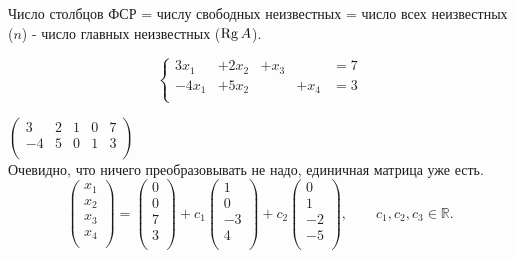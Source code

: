 Число столбцов ФСР = числу свободных неизвестных = число всех неизвестных ($n$) - число главных неизвестных ($\operatorname{\mathop{Rg}} A$). 
\begin{prim}
	$$
	\left\{
	\begin{array}{rrrrrl}
		3x_1&+2x_2&+x_3&&=7\\
		-4x_1&+5x_2&&+x_4&=3\\
	\end{array} \right.
	$$
\end{prim}
$
\left( \begin{array}{rrrr|r}
3 & 2& 1 & 0& 7\\
-4 & 5& 0 & 1& 3\\
\end{array}\right)
$\\
Очевидно, что ничего преобразовывать не надо, единичная матрица уже есть.\\
$$
\begin{pmatrix}
x_1\\
x_2\\
x_3\\
x_4\\
\end{pmatrix}
=
\begin{pmatrix}
0\\
0\\
7\\
3\\
\end{pmatrix}
+c_1
\begin{pmatrix}
1\\
0\\
-3\\
4\\
\end{pmatrix}
+c_2
\begin{pmatrix}
0\\
1\\
-2\\
-5\\
\end{pmatrix}
, \qquad c_1, c_2, c_3 \in \mathbb{R}.
$$

